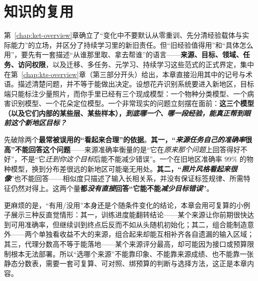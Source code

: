 \chapter{知识的复用}
\label{chap:ket-reuse-selection}

第~\ref{chap:ket-overview}章确立了“变化中不要默认从零重训、先分清经验载体与实际能力”的立场，并区分了持续学习里的新旧责任。但“旧经验值得用”和“具体怎么用”，要先有一套描述“从谁那里取、拿去帮谁”的语言——\textbf{来源、目标、领域、任务、访问权限}，以及迁移、多任务、元学习、持续学习这些范式的正式界定，集中在第~\ref{chap:kts-overview}章（第三部分开头）给出，本章直接沿用其中的记号与术语。描述清楚问题，并不等于能做出决定。设想花卉识别系统要进入新地区，目标端只能标注少量照片，而你手里已经有三个现成模型：一个物种分类模型、一个病害识别模型、一个花朵定位模型。一个非常现实的问题立刻摆在面前：\textbf{这三个模型（以及它们内部的某些层、某些样本），\emph{到底哪一个、哪一段经验，能\emph{真正帮到}眼前这个新地区目标？}}

先破除两个\textbf{最常被误用的“看起来合理”的依据}。\textbf{其一，“\emph{来源任务自己的准确率}很高”不能回答这个问题}——来源准确率衡量的是“它在\emph{原来那个问题}上回答得好不好”，不是“它\emph{迁到你这个目标}后能不能减少错误”。一个在旧地区准确率 99\% 的物种模型，换到分布差很远的新地区可能毫无用处。\textbf{其二，“\emph{照片风格看起来很像}}”也不能回答——相似度只描述了输入长相关系，并没有保证标签规律、所需特征仍然对得上。这两个量\textbf{都\emph{没有直接}回答“它能不能\emph{减少目标错误}”}。

更麻烦的是，“有用/没用”本身还是个随条件变化的结论，本章会用可复算的小例子展示三种反直觉情形：其一，训练进度能翻转结论——某个来源让你前期很快达到可用准确率，但继续训到终点后反而不如从头随机初始化；其二，组合能制造意外——两个单独看收益不大的来源，组合起来却能互相补齐各自遗漏的输入区域；其三，代理分数高不等于能落地——某个来源评分最高，却可能因为接口或预算限制根本无法部署。所以“选哪个来源”不能靠印象、不能靠来源成绩、也不能靠一张静态分数表，需要一套可复算、可对照、绑预算的判断与选择方法，这正是本章内容。

